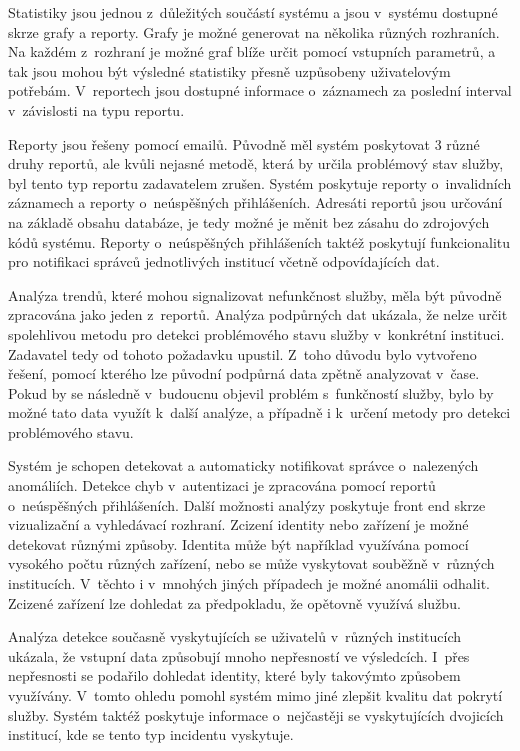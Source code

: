 \documentclass[thesis=M,czech]{FITthesis}[2012/06/26]
\begin{document}
\begin{conclusion}
  Statistiky jsou jednou z~důležitých součástí systému a jsou v~systému dostupné skrze grafy a reporty.
  Grafy je možné generovat na několika různých rozhraních.
  Na každém z~rozhraní je možné graf blíže určit pomocí vstupních parametrů,
  a tak jsou mohou být výsledné statistiky přesně uzpůsobeny uživatelovým potřebám.
  V~reportech jsou dostupné informace o~záznamech za poslední interval
  v~závislosti na typu reportu.

  Reporty jsou řešeny pomocí emailů.
  Původně měl systém poskytovat 3 různé druhy reportů, ale kvůli nejasné metodě,
  která by určila problémový stav služby, 
  byl tento typ reportu zadavatelem zrušen.
  Systém poskytuje reporty o~invalidních záznamech a reporty o~neúspěšných přihlášeních.
  Adresáti reportů jsou určování na základě obsahu databáze,
  je tedy možné je měnit bez zásahu do zdrojových kódů systému.
  Reporty o~neúspěšných přihlášeních taktéž poskytují funkcionalitu
  pro notifikaci správců jednotlivých institucí včetně odpovídajících dat.

  Analýza trendů, které mohou signalizovat nefunkčnost služby,
  měla být původně zpracována jako jeden z~reportů.
  Analýza podpůrných dat ukázala, 
  že nelze určit spolehlivou metodu pro detekci problémového stavu služby v~konkrétní instituci.
  Zadavatel tedy od tohoto požadavku upustil.
  Z~toho důvodu bylo vytvořeno řešení, pomocí kterého lze původní podpůrná data zpětně
  analyzovat v~čase. 
  Pokud by se následně v~budoucnu objevil problém s~funkčností služby,
  bylo by možné tato data využít k~další analýze, a případně i k~určení metody pro detekci problémového stavu.

  Systém je schopen detekovat a automaticky notifikovat správce o~nalezených anomáliích.
  Detekce chyb v~autentizaci je zpracována pomocí reportů o~neúspěšných přihlášeních.
  Další možnosti analýzy poskytuje front end skrze vizualizační a vyhledávací rozhraní.
  Zcizení identity nebo zařízení je možné detekovat různými způsoby.
  Identita může být například využívána pomocí vysokého počtu různých zařízení,
  nebo se může vyskytovat souběžně v~různých institucích.
  V~těchto i v~mnohých jiných případech je možné anomálii odhalit.
  Zcizené zařízení lze dohledat za předpokladu, že opětovně využívá službu.

  Analýza detekce současně vyskytujících se uživatelů v~různých institucích ukázala,
  že vstupní data způsobují mnoho nepřesností ve výsledcích.
  I~přes nepřesnosti se podařilo dohledat identity, které byly takovýmto způsobem využívány.
  V~tomto ohledu pomohl systém mimo jiné zlepšit kvalitu dat pokrytí služby.
  Systém taktéž poskytuje informace o~nejčastěji se vyskytujících dvojicích institucí, 
  kde se tento typ incidentu vyskytuje.


\end{conclusion}
\end{document}
